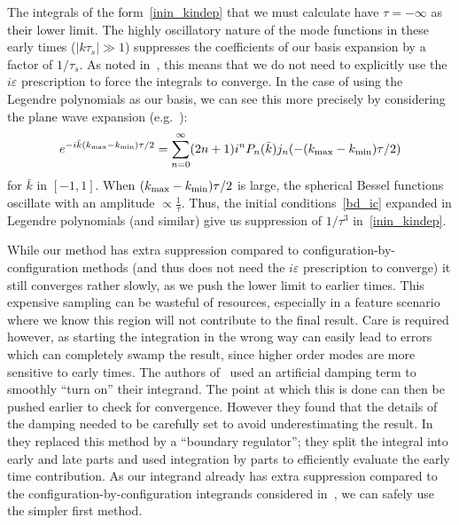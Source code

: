 The integrals of the form~\eqref{inin_kindep} that we must calculate have $\tau=-\infty$ as their lower limit.
The highly oscillatory nature of the mode functions in these early times ($\lvert k\tau_s\rvert\gg1$) suppresses the
coefficients of our basis expansion by a factor of $1/\tau_s$.
As noted in~\cite{Funakoshi}, this means that we do not need to
explicitly use the $i\varepsilon$ prescription to force the integrals to converge.
In the case of using the Legendre polynomials as our
basis, we can see this more precisely by considering
the plane wave expansion (e.g.~\cite{finite_ft_legendre}):
\begin{align}\label{exp_expansion}
    e^{-i\bar{k}({k_\text{max}}-{k_\text{min}})\tau/2} = \sum_{n=0}^{\infty}(2n+1)i^n P_n(\bar{k})j_n(-({k_\text{max}}-{k_\text{min}})\tau/2)
\end{align}
for $\bar{k}$ in $[-1,1]$. When $({k_\text{max}}-{k_\text{min}})\tau/2$ is large, the spherical Bessel functions
oscillate with an amplitude $\propto\frac{1}{\tau}$. Thus,
the initial conditions~\eqref{bd_ic} expanded in Legendre polynomials (and similar)
give us suppression of $1/\tau^3$ in~\eqref{inin_kindep}.


While our method has extra suppression compared to configuration-by-configuration methods
(and thus does not need the $i\varepsilon$ prescription to converge)
it still converges rather slowly, as we push the lower limit to earlier times.
This expensive sampling can be wasteful of resources,
especially in a feature scenario where we know this
region will not contribute to the final result.
Care is required however, as starting the integration in the wrong way can easily lead to
errors which can completely swamp the result, since higher order modes
are more sensitive to early times.
The authors of~\cite{chen_easther_lim_1} used an artificial damping term to smoothly
``turn on'' their integrand.
The point at which this is done can then be pushed earlier to check for convergence.
However they found that the details of the damping needed to
be carefully set to avoid underestimating the result.
In~\cite{chen_easther_lim_2} they replaced this method by a ``boundary regulator'';
they split the integral into early and late parts and used integration by parts to
efficiently evaluate the early time contribution.
As our integrand already has extra suppression compared to the configuration-by-configuration
integrands considered in~\cite{chen_easther_lim_1,chen_easther_lim_2},
we can safely use the simpler first method.


